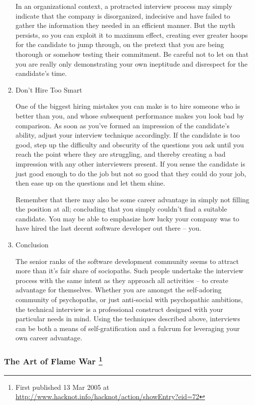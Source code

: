 \documentclass{article}
\begin{document}
\begin{enumerate}
In an organizational context, a protracted interview process may simply
indicate that the company is disorganized, indecisive and have failed to
gather the information they needed in an efficient manner. But the myth
persists, so you can exploit it to maximum effect, creating ever greater
hoops for the candidate to jump through, on the pretext that you are
being thorough or somehow testing their commitment. Be careful not to
let on that you are really only demonstrating your own ineptitude and
disrespect for the candidate's time.

\item Don't Hire Too Smart
\label{sec:orgheadline70}

One of the biggest hiring mistakes you can make is to hire someone who
is better than you, and whose subsequent performance makes you look bad
by comparison. As soon as you've formed an impression of the candidate's
ability, adjust your interview technique accordingly. If the candidate
is too good, step up the difficulty and obscurity of the questions you
ask until you reach the point where they are struggling, and thereby
creating a bad impression with any other interviewers present. If you
sense the candidate is just good enough to do the job but not so good
that they could do your job, then ease up on the questions and let them
shine.

Remember that there may also be some career advantage in simply not
filling the position at all; concluding that you simply couldn't find a
suitable candidate. You may be able to emphasize how lucky your company
was to have hired the last decent software developer out there -- you.

\item Conclusion
\label{sec:orgheadline71}

The senior ranks of the software development community seems to attract
more than it's fair share of sociopaths. Such people undertake the
interview process with the same intent as they approach all activities
-- to create advantage for themselves. Whether you are amongst the
self-adoring community of psychopaths, or just anti-social with
psychopathic ambitions, the technical interview is a professional
construct designed with your particular needs in mind. Using the
techniques described above, interviews can be both a means of
self-gratification and a fulcrum for leveraging your own career
advantage.
\end{enumerate}

\subsubsection{The Art of Flame War  \footnote{First published 13 Mar 2005 at
\url{http://www.hacknot.info/hacknot/action/showEntry?eid=72}}}
\label{sec:orgheadline89}
\end{document}
